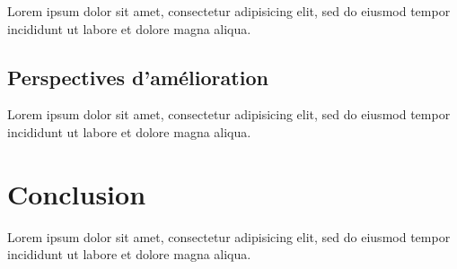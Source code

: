 \documentclass[12pt]{article}
\begin{document}
Lorem ipsum dolor sit amet, consectetur adipisicing elit, sed do eiusmod tempor
incididunt ut labore et dolore magna aliqua.

\subsection{Perspectives d'amélioration}

Lorem ipsum dolor sit amet, consectetur adipisicing elit, sed do eiusmod tempor
incididunt ut labore et dolore magna aliqua.

\section{Conclusion}

Lorem ipsum dolor sit amet, consectetur adipisicing elit, sed do eiusmod tempor
incididunt ut labore et dolore magna aliqua.
\end{document}
